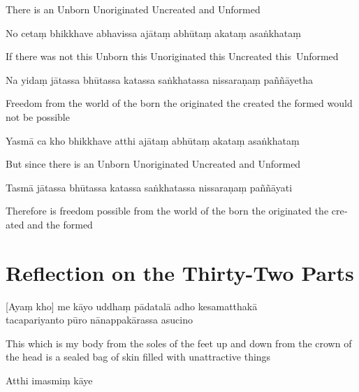 \begin{english}
  There is an Unborn Unoriginated Uncreated and Unformed
\end{english}

No cetaṃ bhikkhave abhavissa ajātaṃ abhūtaṃ akataṃ asaṅkhataṃ

\begin{english}
  If there was not this Unborn this Unoriginated this Uncreated this~Unformed
\end{english}

Na yidaṃ jātassa bhūtassa katassa saṅkhatassa nissaraṇaṃ paññāyetha

\begin{english}
  Freedom from the world of the born the originated the created the formed would not be possible
\end{english}

Yasmā ca kho bhikkhave atthi ajātaṃ abhūtaṃ akataṃ asaṅkhataṃ

\begin{english}
  But since there is an Unborn Unoriginated Uncreated and Unformed
\end{english}

Tasmā jātassa bhūtassa katassa saṅkhatassa nissaraṇaṃ paññāyati

\begin{english}
  Therefore is freedom possible from the world of the born the originated the created and the formed 
\end{english}

\section{Reflection on the Thirty-Two Parts}

\begin{leader}
\end{leader}


[Ayaṃ kho] me kāyo uddhaṃ pādatalā adho kesamatthakā\\
tacapariyanto pūro nānappakārassa asucino

\begin{english}
  This which is my body from the soles of the feet up and down from the crown of the head is a sealed bag of skin filled with unattractive things
\end{english}

Atthi imasmiṃ kāye

